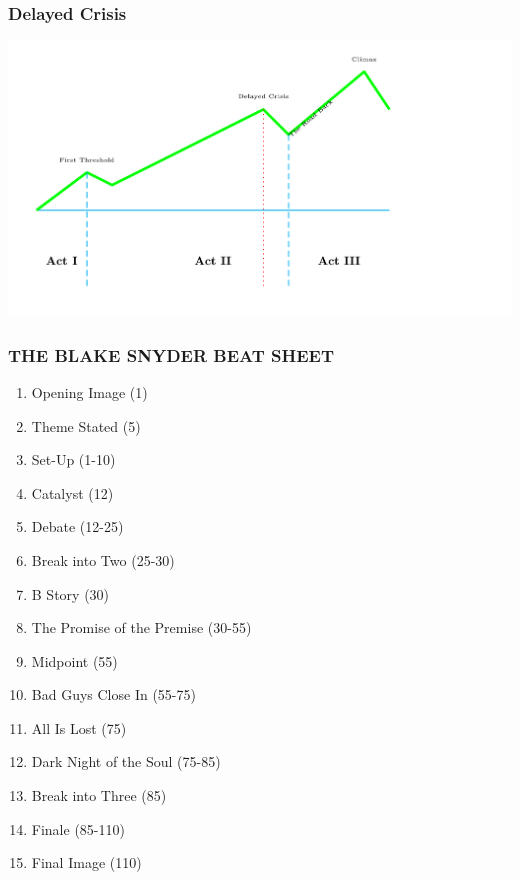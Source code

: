 \documentclass{beamer}
\begin{document}
\begin{frame}\frametitle{Delayed Crisis}
\includegraphics[scale=0.25]{herofig04.png}
\end{frame}
\begin{frame}\frametitle{THE BLAKE SNYDER BEAT SHEET}

\begin{enumerate}
\item Opening Image (1)
\item Theme Stated (5)
\item Set-Up (1-10)
\item Catalyst (12)
\item Debate (12-25)
\item Break into Two (25-30)
\item B Story (30)
\item The Promise of the Premise (30-55)
\item Midpoint (55)
\item Bad Guys Close In (55-75)
\item All Is Lost (75)
\item Dark Night of the Soul (75-85)
\item Break into Three (85)
\item Finale (85-110)
\item Final Image (110)
\end{enumerate}


\end{frame}
\end{document}
